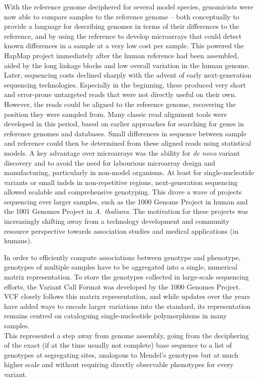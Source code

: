 With the reference genome deciphered for several model species, genomicists were now able to compare samples to the reference genome -- both conceptually to provide a language for describing genomes in terms of their differences to the reference, and by using the reference to develop microarrays that could detect known differences in a sample at a very low cost per sample.
This powered the HapMap project immediately after the human reference had been assembled, aided by the long linkage blocks and low overall variation in the human genome\cite{altshuler05}.
Later, sequencing costs declined sharply with the advent of early next-generation sequencing technologies.
Especially in the beginning, these produced very short and error-prone untargeted reads that were not directly useful on their own.
However, the reads could be aligned to the reference genome, recovering the position they were sampled from.
Many classic read alignment tools were developed in this period, based on earlier approaches for searching for genes in reference genomes and databases\cite{li08, kent02}.
Small differences in sequence between sample and reference could then be determined from these aligned reads using statistical models\cite{li08, mckenna10}.
A key advantage over microarrays was the ability for \textit{de novo} variant discovery and to avoid the need for labourious microarray design and manufacturing, particularly in non-model organisms.
At least for single-nucleotide variants or small indels in non-repetitive regions, next-generation sequencing allowed scalable and comprehensive genotyping.
This drove a wave of projects sequencing ever larger samples, such as the 1000 Genome Project in human and the 1001 Genomes Project in \textit{A. thaliana}\cite{weigel09, durbin10}.
The motivation for these projects was increasingly shifting away from a technology development and community resource perspective towards association studies and medical applications (in humans).

In order to efficiently compute associations between genotype and phenotype, genotypes of multiple samples have to be aggregated into a single, numerical matrix representation\cite{shabalin12}.
To store the genotypes collected in large-scale sequencing efforts, the Variant Call Format was developed by the 1000 Genomes Project\cite{durbin10}.
VCF closely follows this matrix representation, and while updates over the years have added ways to encode larger variations into the standard, its representation remains centred on cataloguing single-nucleotide polymorphisms in many samples\cite{htsspecs}.\\
This represented a step away from genome assembly, going from the deciphering of the exact (if at the time usually not complete) base sequence to a list of genotypes at segregating sites, analogous to Mendel's genotypes but at much higher scale and without requiring directly observable phenotypes for every variant.

